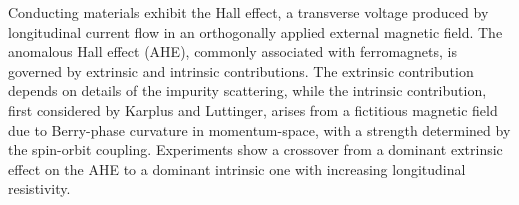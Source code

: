 \documentclass[prb,twocolumn,showpacs,preprintnumbers,amsmath,amssymb]{revtex4}
\begin{document}
Conducting materials exhibit the Hall effect, a transverse voltage produced by longitudinal current flow in an orthogonally applied external magnetic field.  
The anomalous Hall effect (AHE), commonly associated with ferromagnets, is governed by extrinsic and intrinsic contributions.\cite{Nagaosa_2010}
The extrinsic contribution depends on details of the impurity scattering, while the intrinsic contribution, first considered by Karplus and Luttinger,\cite{PR1954} arises from a fictitious magnetic field due to Berry-phase curvature in momentum-space, with a strength determined by the spin-orbit coupling.\cite{Nagaosa_2010, DiXiao2010}  Experiments show a crossover from a dominant extrinsic effect on the AHE to a dominant intrinsic one with increasing longitudinal resistivity.\cite{YTokuraPRL2007}  
\end{document}
